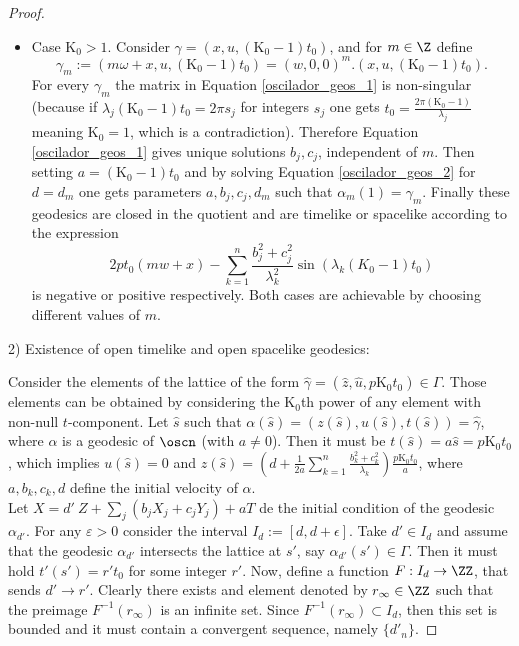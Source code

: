 \documentclass[12pt]{amsart}
\theoremstyle{plain}
\theoremstyle{definition}
\theoremstyle{remark}
\begin{document}
\begin{proof}
\begin{itemize}
				\item Case $\mathrm{K_0}>1$. Consider $\gamma=(x,u,(\mathrm{K_0}-1)t_0)$, and for $m\in \Z$ define 
				$$\gamma_m := {(m \omega + x, u, (\mathrm{K_0}-1) t_0)} = (w,0,0)^m.(x,u,(\mathrm{K_0}-1) t_0).$$
				 For every $\gamma_m$ the matrix in Equation \eqref{oscilador_geos_1} is non-singular (because if $\lambda_j (\mathrm{K_0}-1) t_0 = 2 \pi s_j$ for integers $s_j$ one gets $t_0 = \frac{2 \pi (\mathrm{K_0}-1)}{\lambda_j}$ meaning $\mathrm{K_0}=1$, which is a contradiction). Therefore Equation \eqref{oscilador_geos_1} gives unique solutions $b_j,c_j$, independent of $m$. Then setting $a=(\mathrm{K_0}-1) t_0$ and by solving Equation \eqref{oscilador_geos_2} for $d=d_m$ one gets parameters $a,b_j,c_j,d_m$ such that $\alpha_m(1) = \gamma_m$.     
				Finally these geodesics are closed in the quotient and are timelike or spacelike according to the expression  $$ 2 p t_0 (mw+x) - \sum_{k=1}^{n} \frac{b_j^2 + c_j^2}{\lambda_k^2}\sin(\lambda_k (K_0-1) t_0) $$ is negative or positive respectively. Both cases are achievable by choosing different values of $m$.
				
			\end{itemize}
		
		
			
			2) Existence of open timelike and open spacelike geodesics:
			
		Consider the elements of the lattice of the form  $\hat{\gamma}=(\hat{z},\hat{u}, p \mathrm{K_0} t_0) \in \Gamma$. Those elements can be obtained by considering the $\mathrm{K_0}$th power of  any element with non-null $t$-component. Let $\hat{s}$ such that $\alpha(\hat{s})=(z(\hat{s}),u(\hat{s}),t(\hat{s})) = \hat{\gamma}$, where $\alpha$ is a geodesic of $\oscn$ (with $a \neq 0$). Then it must be $t(\hat{s}) = a \hat{s} = p \mathrm{K_0} t_0$, which implies $u(\hat{s})=0$ and $z(\hat{s}) = (d + \frac{1}{2 a} \sum^n_{k=1} \frac{b_k^2+ c_k^2}{\lambda_k}) \frac{p \mathrm{K_0}t_0}{a}$, where $a, b_k, c_k, d$ define the initial velocity of $\alpha$. \\
			
			Let $X =  d' \ Z + \sum_j (b_j X_j + c_j Y_j) + a T$ de the initial condition of the geodesic $\alpha_{d'}$. For any $\varepsilon >0$ consider the interval  $I_d := [d, d+ \epsilon]$. Take  $d'\in I_d$ and assume that the geodesic $\alpha_{d'}$ intersects the lattice  at $s'$, say $\alpha_{d'}(s') \in \Gamma$. Then it must hold $t'(s') = r' t_0$ for some integer $r'$. Now, define a function $F: I_d \to \ZZ$, that sends $d'\to r'$. 
		Clearly there exists and element denoted by $r_{\infty}\in \ZZ$ such that  the  preimage  $F^{-1}(r_{\infty})$ is an infinite set. Since $F^{-1}(r_{\infty})\subset I_d$, then this set is bounded and it must contain a convergent sequence, namely $\{d'_n\}$.
			

\end{proof}
\end{document}
